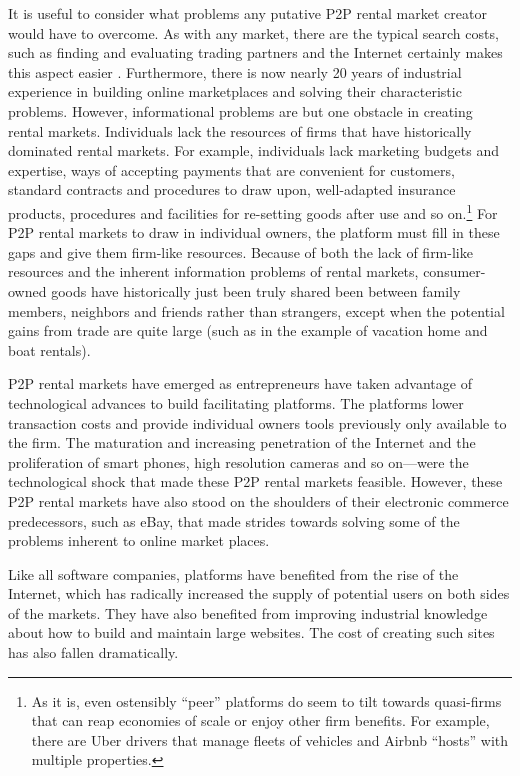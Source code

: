 \documentclass[11pt]{article}
\begin{document}
It is useful to consider what problems any putative P2P rental market creator would have to overcome.
As with any market, there are the typical search costs, such as finding and evaluating trading partners and the Internet certainly makes this aspect easier \citep{bakos1997reducing}.
Furthermore, there is now nearly 20 years of industrial experience in building online marketplaces and solving their characteristic problems. 
However, informational problems are but one obstacle in creating rental markets.
Individuals lack the resources of firms that have historically dominated rental markets. 
For example, individuals lack marketing budgets and expertise, ways of accepting payments that are convenient for customers, standard contracts and procedures to draw upon, well-adapted insurance products, procedures and facilities for re-setting goods after use and so on.\footnote{
  As it is, even ostensibly ``peer'' platforms do seem to tilt towards quasi-firms that can reap economies of scale or enjoy other firm benefits.
  For example, there are Uber drivers that manage fleets of vehicles and Airbnb ``hosts'' with multiple properties. 
  }
For P2P rental markets to draw in individual owners, the platform must fill in these gaps and give them firm-like resources. 
Because of both the lack of firm-like resources and the inherent information problems of rental markets, consumer-owned goods have historically just been truly shared been between family members, neighbors and friends rather than strangers, except when the potential gains from trade are quite large (such as in the example of vacation home and boat rentals). 

P2P rental markets have emerged as entrepreneurs have taken advantage of technological advances to build facilitating platforms. 
The platforms lower transaction costs and provide individual owners tools previously only available to the firm. 
The maturation and increasing penetration of the Internet and the proliferation of smart phones, high resolution cameras and so on---were the technological shock that made these P2P rental markets feasible. 
However, these P2P rental markets have also stood on the shoulders of their electronic commerce predecessors, such as eBay, that made strides towards solving some of the problems inherent to online market places. 

Like all software companies, platforms have benefited from the rise of the Internet, which has radically increased the supply of potential users on both sides of the markets. 
They have also benefited from improving industrial knowledge about how to build and maintain large websites.
The cost of creating such sites has also fallen dramatically. 
\end{document}
